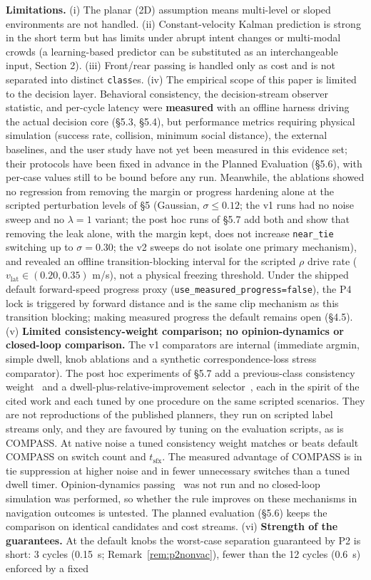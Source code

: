 \documentclass[11pt]{article}
\newcommand{\Class}{\texttt{class}}
\newcommand{\code}[1]{\texttt{#1}}
\begin{document}
\textbf{Limitations.} (i) The planar (2D) assumption means multi-level or sloped environments are not handled. (ii) Constant-velocity Kalman prediction is strong in the short term but has limits under abrupt intent changes or multi-modal crowds (a learning-based predictor can be substituted as an interchangeable input, Section 2). (iii) Front/rear passing is handled only as cost and is not separated into distinct \Class{es}. (iv) The empirical scope of this paper is limited to the decision layer. Behavioral consistency, the decision-stream observer statistic, and per-cycle latency were \textbf{measured} with an offline harness driving the actual decision core (\S5.3, \S5.4), but performance metrics requiring physical simulation (success rate, collision, minimum social distance), the external baselines, and the user study have not yet been measured in this evidence set; their protocols have been fixed in advance in the Planned Evaluation (\S5.6), with per-case values still to be bound before any run. Meanwhile, the ablations showed no regression from removing the margin or progress hardening alone at the scripted perturbation levels of \S5 (Gaussian, $\sigma\le0.12$; the v1 runs had no noise sweep and no $\lambda=1$ variant; the post hoc runs of \S5.7 add both and show that removing the leak alone, with the margin kept, does not increase \code{near\_tie} switching up to $\sigma=0.30$; the v2 sweeps do not isolate one primary mechanism), and revealed an offline transition-blocking interval for the scripted $\rho$ drive rate ($v_{\text{lat}} \in (0.20, 0.35)$ m/s), not a physical freezing threshold. Under the shipped default forward-speed progress proxy (\code{use\_measured\_progress=false}), the P4 lock is triggered by forward distance and is the same clip mechanism as this transition blocking; making measured progress the default remains open (\S4.5). (v) \textbf{Limited consistency-weight comparison; no opinion-dynamics or closed-loop comparison.} The v1 comparators are internal (immediate argmin, simple dwell, knob ablations and a synthetic correspondence-loss stress comparator). The post hoc experiments of \S5.7 add a previous-class consistency weight~\cite{degroot2024topology, martinezbaselga2026shine} and a dwell-plus-relative-improvement selector~\cite{li2026bigcbf}, each in the spirit of the cited work and each tuned by one procedure on the same scripted scenarios. They are not reproductions of the published planners, they run on scripted label streams only, and they are favoured by tuning on the evaluation scripts, as is COMPASS. At native noise a tuned consistency weight matches or beats default COMPASS on switch count and $t_{\text{sfx}}$. The measured advantage of COMPASS is in tie suppression at higher noise and in fewer unnecessary switches than a tuned dwell timer. Opinion-dynamics passing~\cite{cathcart2023opinion} was not run and no closed-loop simulation was performed, so whether the rule improves on these mechanisms in navigation outcomes is untested. The planned evaluation (\S5.6) keeps the comparison on identical candidates and cost streams. (vi) \textbf{Strength of the guarantees.} At the default knobs the worst-case separation guaranteed by P2 is short: 3 cycles (0.15~s; Remark~\ref{rem:p2nonvac}), fewer than the 12 cycles (0.6~s) enforced by a fixed 
\end{document}

